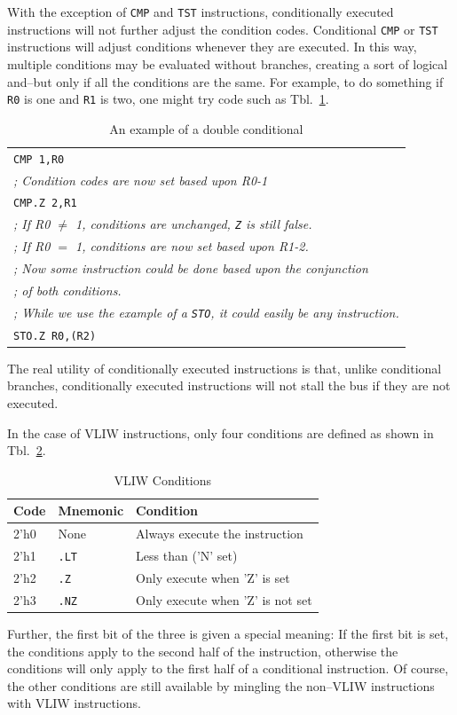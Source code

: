 \documentclass{gqtekspec}
\begin{document}
With the exception of \hbox{\tt CMP} and \hbox{\tt TST} instructions,
conditionally executed instructions will not further adjust the condition codes.
Conditional \hbox{\tt CMP} or \hbox{\tt TST} instructions will adjust conditions
whenever they are executed.  In this way, multiple conditions may be evaluated
without branches, creating a sort of logical and--but only if all the conditions
are the same.  For example, to do something if \hbox{\tt R0} is one and
\hbox{\tt R1} is two, one might try code such as Tbl.~\ref{tbl:dbl-condition}.
\begin{table}\begin{center}
\begin{tabular}{l}
	{\tt CMP 1,R0} \\
	{\em ; Condition codes are now set based upon R0-1} \\
	{\tt CMP.Z 2,R1} \\
	{\em ; If R0 $\neq$ 1, conditions are unchanged, {\tt Z} is still false.} \\
	{\em ; If R0 $=$ 1, conditions are now set based upon R1-2.} \\
	{\em ; Now some instruction could be done based upon the conjunction} \\
	{\em ; of both conditions.} \\
	{\em ; While we use the example of a {\tt STO}, it could easily be any
		instruction.} \\
	{\tt STO.Z R0,(R2)} \\
\end{tabular}
\caption{An example of a double conditional}\label{tbl:dbl-condition}
\end{center}\end{table}

The real utility of conditionally executed instructions is that, unlike
conditional branches, conditionally executed instructions will not stall
the bus if they are not executed.

In the case of VLIW instructions, only four conditions are defined as shown 
in Tbl.~\ref{tbl:vliw-conditions}.
\begin{table}\begin{center}
\begin{tabular}{l|l|l}
Code & Mnemonic & Condition \\\hline
2'h0 & None & Always execute the instruction \\
2'h1 & {\tt .LT} & Less than ('N' set) \\
2'h2 & {\tt .Z} & Only execute when 'Z' is set \\
2'h3 & {\tt .NZ} & Only execute when 'Z' is not set \\
\end{tabular}
\caption{VLIW Conditions}\label{tbl:vliw-conditions}
\end{center}\end{table}
Further, the first bit of the three is given a special meaning: If the first
bit is set, the conditions apply to the second half of the instruction,
otherwise the conditions will only apply to the first half of a conditional
instruction.  Of course, the other conditions are still available by mingling
the non--VLIW instructions with VLIW instructions.
\end{document}
